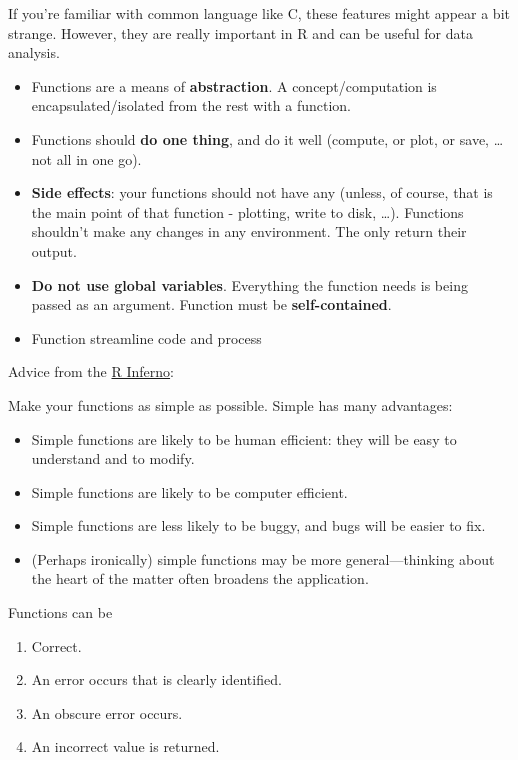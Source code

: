 \documentclass[]{book}
\providecommand{\tightlist}{%
  \setlength{\itemsep}{0pt}\setlength{\parskip}{0pt}}
\theoremstyle{definition}
\theoremstyle{definition}
\theoremstyle{definition}
\theoremstyle{remark}
\begin{document}
If you're familiar with common language like C, these features might
appear a bit strange. However, they are really important in R and can be
useful for data analysis.

\begin{itemize}
\tightlist
\item
  Functions are a means of \textbf{abstraction}. A concept/computation
  is encapsulated/isolated from the rest with a function.
\item
  Functions should \textbf{do one thing}, and do it well (compute, or
  plot, or save, \ldots{} not all in one go).
\item
  \textbf{Side effects}: your functions should not have any (unless, of
  course, that is the main point of that function - plotting, write to
  disk, \ldots{}). Functions shouldn't make any changes in any
  environment. The only return their output.
\item
  \textbf{Do not use global variables}. Everything the function needs is
  being passed as an argument. Function must be \textbf{self-contained}.
\item
  Function streamline code and process
\end{itemize}

Advice from the
\href{http://www.burns-stat.com/pages/Tutor/R_inferno.pdf}{R Inferno}:

Make your functions as simple as possible. Simple has many advantages:

\begin{itemize}
\tightlist
\item
  Simple functions are likely to be human efficient: they will be easy
  to understand and to modify.
\item
  Simple functions are likely to be computer efficient.
\item
  Simple functions are less likely to be buggy, and bugs will be easier
  to fix.
\item
  (Perhaps ironically) simple functions may be more general---thinking
  about the heart of the matter often broadens the application.
\end{itemize}

Functions can be

\begin{enumerate}
\def\labelenumi{\arabic{enumi}.}
\tightlist
\item
  Correct.
\item
  An error occurs that is clearly identified.
\item
  An obscure error occurs.
\item
  An incorrect value is returned.
\end{enumerate}
\end{document}

